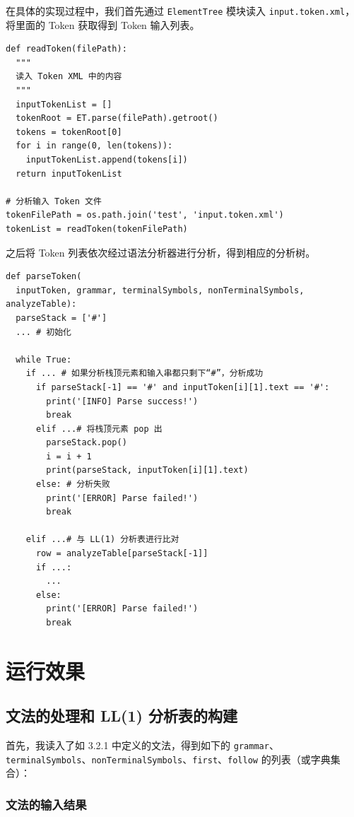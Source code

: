\documentclass[UTF8]{ctexart}
\begin{document}
在具体的实现过程中，我们首先通过 \texttt{ElementTree} 模块读入 \texttt{input.token.xml}，将里面的 Token 获取得到 Token 输入列表。

\begin{verbatim}
def readToken(filePath):
  """
  读入 Token XML 中的内容
  """
  inputTokenList = []
  tokenRoot = ET.parse(filePath).getroot()
  tokens = tokenRoot[0]
  for i in range(0, len(tokens)):
    inputTokenList.append(tokens[i])
  return inputTokenList

# 分析输入 Token 文件
tokenFilePath = os.path.join('test', 'input.token.xml')
tokenList = readToken(tokenFilePath)
\end{verbatim}

之后将 Token 列表依次经过语法分析器进行分析，得到相应的分析树。

\begin{verbatim}
def parseToken(
  inputToken, grammar, terminalSymbols, nonTerminalSymbols, analyzeTable):
  parseStack = ['#']
  ... # 初始化

  while True:
    if ... # 如果分析栈顶元素和输入串都只剩下“#”，分析成功
      if parseStack[-1] == '#' and inputToken[i][1].text == '#':
        print('[INFO] Parse success!')
        break
      elif ...# 将栈顶元素 pop 出
        parseStack.pop()
        i = i + 1
        print(parseStack, inputToken[i][1].text)
      else: # 分析失败
        print('[ERROR] Parse failed!')
        break

    elif ...# 与 LL(1) 分析表进行比对
      row = analyzeTable[parseStack[-1]]
      if ...:
        ...
      else:
        print('[ERROR] Parse failed!')
        break
\end{verbatim}

\section{运行效果}
\subsection{文法的处理和 LL(1) 分析表的构建}
首先，我读入了如 3.2.1 中定义的文法，得到如下的 \texttt{grammar}、\texttt{terminalSymbols}、\texttt{nonTerminalSymbols}、\texttt{first}、\texttt{follow} 的列表（或字典集合）：

\subsubsection{文法的输入结果}
\end{document}
